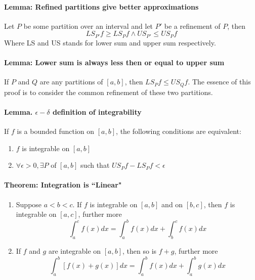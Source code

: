 \documentclass[11pt]{article}
\begin{document}
\paragraph{Lemma: Refined partitions give better approximations} Let $P$ be some partition over an interval and let $P'$ be a refinement of $P$, then
\begin{equation*}
    LS_{P'}f \geq LS_{P}f \wedge US_{P'} \leq US_{P}f
\end{equation*}
Where LS and US stands for lower sum and upper sum respectively.

\paragraph{Lemma: Lower sum is always less then or equal to upper sum} If $P$ and $Q$ are any partitions of $[a,b]$, then $LS_Pf \leq US_Qf$. The essence of this proof is to consider the common refinement of these two partitions.

\paragraph{Lemma. $\epsilon-\delta$ definition of integrability} If $f$ is a bounded function on $[a,b]$, the following conditions are equivalent:
\begin{enumerate}
    \item $f$ is integrable on $[a,b]$
    \item $\forall \epsilon > 0, \exists P$ of $[a,b]$ such that $US_Pf - LS_Pf < \epsilon$
\end{enumerate}

\paragraph{Theorem:  Integration is ``Linear"}
\begin{enumerate}
    \item Suppose $a < b<c$. If $f$ is integrable on $[a,b]$ and on $[b,c]$, then $f$ is integrable on $[a,c]$, further more
    \begin{equation*}
        \int_a^c f(x)dx = \int_a^b f(x)dx + \int_b^c f(x)dx
    \end{equation*}
    \item If $f$ and $g$ are integrable on $[a,b]$, then so is $f+g$, further more
    \begin{equation*}
        \int_a^b [f(x) + g(x)]dx = \int_a^b f(x)dx + \int_a^b g(x)dx
    \end{equation*}
\end{enumerate}
\end{document}
